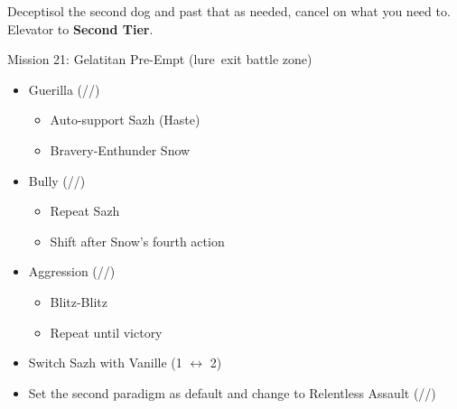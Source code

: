 \renewcommand{\first}{[1] Guerilla (\syn/\sab/\rav)}
\renewcommand{\second}{[2] Devastation (\com/\sab/\com)}
\renewcommand{\third}{[3] Hero's Charge (\syn/\med/\com)}
\renewcommand{\fourth}{[4] Tireless Charge (\com/\med/\com)}
\renewcommand{\fifth}{[5] Bully (\syn/\sab/\com)}
\renewcommand{\sixth}{[6] Aggression (\com/\rav/\com)}

	Deceptisol the second dog and past that as needed, cancel on what you need to.
	Elevator to \textbf{Second Tier}.
	\vfill
	\ 
	\begin{battle}[0:37]{Mission 21: Gelatitan Pre-Empt (lure\, exit battle zone)}
		\begin{itemize}
			\item \first
			      \begin{itemize}
				      \item Auto-support Sazh (Haste)
				      \item Bravery-Enthunder Snow
			      \end{itemize}
			\item \fifth
			      \begin{itemize}
				      \item Repeat Sazh
				      \item Shift after Snow's fourth action
			      \end{itemize}
			\item \sixth
			      \begin{itemize}
				      \item Blitz-Blitz
				      \item Repeat until victory
			      \end{itemize}
		\end{itemize}
	\end{battle}
	\begin{menu}
		\begin{itemize}
			\paradigm
			\begin{itemize}
				\item Switch Sazh with Vanille (1 $\leftrightarrow$ 2)
				\item Set the second paradigm as default and change to Relentless Assault (\rav/\com/\rav)
			\end{itemize}
		\end{itemize}
	\end{menu}
	\renewcommand{\second}{[2] Relentless Assault (\rav/\com/\rav)}
	
